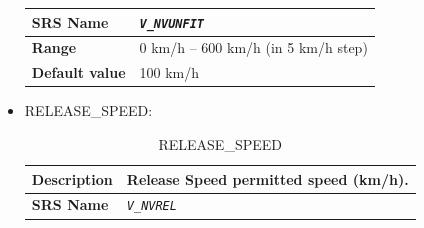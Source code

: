 \begin{itemize}
\begin{longtable}{|l|l|}
					\begin{minipage}[t]{0.22\linewidth} \textbf{SRS Name}	\end{minipage}
				&	\begin{minipage}[t]{0.78\linewidth} \emph{\texttt{V\_NVUNFIT}} \end{minipage} \\

				\hline

					\begin{minipage}[t]{0.22\linewidth} \textbf{Range}	\end{minipage}
				&	\begin{minipage}[t]{0.78\linewidth} 0 km/h – 600 km/h (in 5 km/h step) \end{minipage} \\

				\hline

					\begin{minipage}[t]{0.22\linewidth} \textbf{Default value}	\end{minipage}
				&	\begin{minipage}[t]{0.78\linewidth} 100 km/h \end{minipage} \\

				\hline

			\end{longtable}



		\item RELEASE\_SPEED:

			\begin{longtable}{|l|l|}
				\caption{RELEASE\_SPEED}\\
				\hline

					\begin{minipage}[t]{0.22\linewidth} \textbf{Description}	\end{minipage}
				&	\begin{minipage}[t]{0.78\linewidth} Release Speed permitted speed (km/h). \end{minipage} \\

				\hline

					\begin{minipage}[t]{0.22\linewidth} \textbf{SRS Name}	\end{minipage}
				&	\begin{minipage}[t]{0.78\linewidth} \emph{\texttt{V\_NVREL}} \end{minipage} \\


\end{longtable}
\end{itemize}
